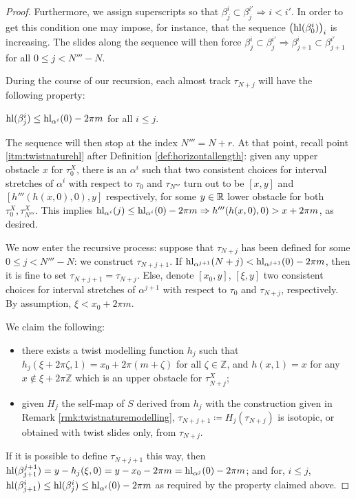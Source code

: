\begin{proof}
Furthermore, we assign superscripts so that $\beta_j^i\subset \beta_j^{i'}\Rightarrow i<i'$. In order to get this condition one may impose, for instance, that the sequence $\left(\mathrm{hl}(\beta_0^i)\right)_i$ is increasing. The slides along the sequence will then force $\beta_j^i\subset \beta_j^{i'} \Rightarrow \beta_{j+1}^i\subset \beta_{j+1}^{i'}$ for all $0\leq j < N'''-N$.

During the course of our recursion, each almost track $\tau_{N+j}$ will have the following property: 
\begin{center}
$\mathrm{hl}(\beta_j^i)\leq \mathrm{hl}_{\alpha^i}(0)-2\pi m$ for all $i\leq j$.
\end{center}

The sequence will then stop at the index $N'''=N+r$. At that point, recall point \ref{itm:twistnaturehl} after Definition \ref{def:horizontallength}: given any upper obstacle $x$ for $\tau_0^X$, there is an $\alpha^i$ such that two consistent choices for interval stretches of $\alpha^i$ with respect to $\tau_0$ and $\tau_{N'''}$ turn out to be $[x,y]$ and $[h'''(h(x,0),0),y]$ respectively, for some $y\in\mathbb R$ lower obstacle for both $\tau_0^X,\tau_{N'''}^X$. This implies $\mathrm{hl}_{\alpha^i}(j)\leq \mathrm{hl}_{\alpha^i}(0)-2\pi m\Rightarrow h'''(h(x,0),0)>x+2\pi m$, as desired.

We now enter the recursive process: suppose that $\tau_{N+j}$ has been defined for some $0\leq j <N'''-N$: we construct $\tau_{N+j+1}$. If $\mathrm{hl}_{\alpha^{j+1}}(N+j)<\mathrm{hl}_{\alpha^{j+1}}(0)-2\pi m$, then it is fine to set $\tau_{N+j+1}=\tau_{N+j}$. Else, denote $[x_0,y]$, $[\xi,y]$ two consistent choices for interval stretches of $\alpha^{j+1}$ with respect to $\tau_0$ and $\tau_{N+j}$, respectively. By assumption, $\xi<x_0+2\pi m$.

We claim the following:
\begin{itemize}
\item there exists a twist modelling function $h_j$ such that $h_j(\xi+2\pi \zeta,1)=x_0+2\pi(m+\zeta)$ for all $\zeta\in\mathbb Z$, and $h(x,1)=x$ for any $x\not\in\xi+2\pi\mathbb Z$ which is an upper obstacle for $\tau_{N+j}^X$; 
\item given $H_j$ the self-map of $S$ derived from $h_j$ with the construction given in Remark \ref{rmk:twistnaturemodelling}, $\tau_{N+j+1}\coloneqq H_j(\tau_{N+j})$ is isotopic, or obtained with twist slides only, from $\tau_{N+j}$.
\end{itemize}

If it is possible to define $\tau_{N+j+1}$ this way, then $\mathrm{hl}(\beta_{j+1}^{j+1})=y-h_j(\xi,0)= y-x_0-2\pi m= \mathrm{hl}_{\alpha^j}(0)-2\pi m$; and for, $i\leq j$, $\mathrm{hl}(\beta_{j+1}^i)\leq \mathrm{hl}(\beta_j^i) \leq \mathrm{hl}_{\alpha^i}(0)-2\pi m$ as required by the property claimed above.


\end{proof}
